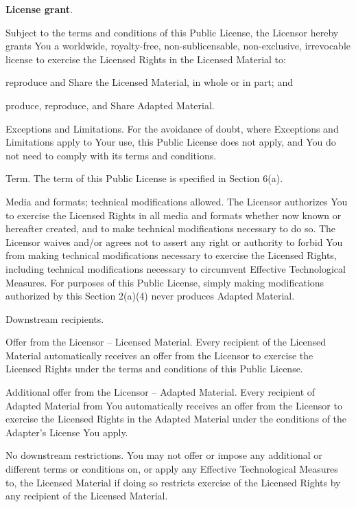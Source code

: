 	\begin{ccEnumerate}
		\item \textbf{License grant}.
		      \begin{ccEnumerate}
		      	\item Subject to the terms and conditions of this Public License, the Licensor hereby grants You a worldwide, 
				royalty-free, non-sublicensable, non-exclusive, irrevocable license to exercise the Licensed Rights 
				      in the Licensed Material to:
		      	      \begin{ccEnumerate}
		      	      	\item reproduce and Share the Licensed Material, in whole or in part; and
		      	      	\item produce, reproduce, and Share Adapted Material.
		      	      \end{ccEnumerate}
		      	\item Exceptions and Limitations. For the avoidance of doubt, where Exceptions and Limitations apply to Your use, 
				this Public License does not apply, and You do not need to comply with its terms and conditions.
		      	\item Term. The term of this Public License is specified in Section 6(a).
		      	\item Media and formats; technical modifications allowed. The Licensor authorizes You to exercise the Licensed 
				Rights in all media and formats whether now known or hereafter created, and to make technical 
				      modifications necessary to do so. The Licensor waives and/or agrees not to assert any right or 
				      authority to forbid You from making technical modifications necessary to exercise the Licensed 
				      Rights, including technical modifications necessary to circumvent Effective Technological Measures. 
				      For purposes of this Public License, simply making modifications authorized by this Section 2(a)(4) 
				      never produces Adapted Material.
		      	\item Downstream recipients.
		      	      
		      	      \begin{ccEnumerate}
		      	      	\item Offer from the Licensor – Licensed Material. Every recipient of the Licensed Material automatically 
					receives an offer from the Licensor to exercise the Licensed Rights under the terms and conditions 
					      of this Public License.
		      	      	\item Additional offer from the Licensor – Adapted Material. Every recipient of Adapted Material from 
					You automatically receives an offer from the Licensor to exercise the Licensed Rights in the 
					      Adapted Material under the conditions of the Adapter’s License You apply.
		      	      	\item No downstream restrictions. You may not offer or impose any additional or different terms or 
					conditions on, or apply any Effective Technological Measures to, the Licensed Material if 
					      doing so restricts exercise of the Licensed Rights by any recipient of the Licensed Material.
		      	      \end{ccEnumerate}
		      	      

\end{ccEnumerate}
\end{ccEnumerate}
